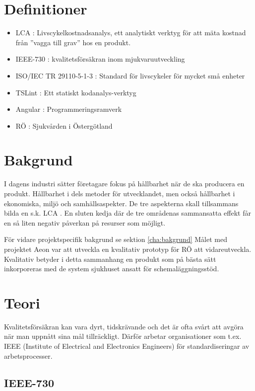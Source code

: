 \section{Definitioner}
\begin{itemize}
	\item LCA :  Livscykelkostnadsanalys, ett analytiskt verktyg för att mäta kostnad från ''vagga till grav'' hos en produkt.
	\item IEEE-730 : kvalitetsförsäkran inom mjukvaruutveckling
	\item ISO/IEC TR 29110-5-1-3 : Standard för livscykeler för mycket små enheter
	\item TSLint : Ett statiskt kodanalys-verktyg
	\item Angular : Programmeringsramverk
	\item RÖ : Sjukvården i Östergötland
\end{itemize}

\section{Bakgrund}
I dagens industri sätter företagare fokus på hållbarhet när de ska producera en produkt. Hållbarhet i dels metoder för utvecklandet, men också hållbarhet i ekonomiska, miljö och samhällsaspekter.
De tre aspekterna skall tillsammans bilda en s.k. LCA \cite{LCA}. En sluten kedja där de tre områdenas sammansatta effekt får en så liten negativ påverkan på resurser som möjligt.

För vidare projektspecifik bakgrund se sektion \ref{cha:bakgrund}
Målet med projektet Aeon var att utveckla en kvalitativ prototyp för RÖ att vidareutveckla. Kvalitativ betyder i detta sammanhang en produkt som på bästa sätt inkorporeras med de system sjukhuset ansatt för schemaläggningsstöd.

\section{Teori}

Kvalitetsförsäkran kan vara dyrt, tidskrävande och det är ofta svårt att avgöra när man uppnått sina mål tillräckligt\cite{lighthouse}.
Därför arbetar organisationer som t.ex. IEEE (Institute of Electrical and Electronics Engineers) för standardiseringar av arbetsprocesser.

\subsection{IEEE-730}

